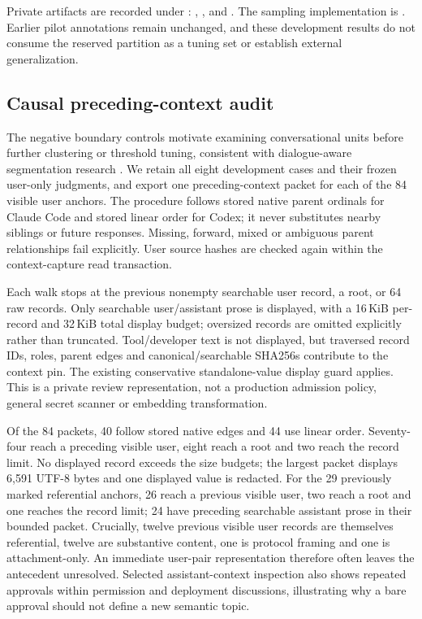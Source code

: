 \documentclass[11pt]{article}
\begin{document}
Private artifacts are recorded under :
, ,  and
. The sampling implementation is
. Earlier pilot annotations remain
unchanged, and these development results do not consume the reserved partition
as a tuning set or establish external generalization.

\subsection{Causal preceding-context audit}
The negative boundary controls motivate examining conversational units before
further clustering or threshold tuning, consistent with dialogue-aware
segmentation research \cite{khatri,xing,gao}. We retain all eight development cases
and their frozen user-only judgments, and export one preceding-context packet
for each of the 84 visible user anchors. The procedure follows stored native
parent ordinals for Claude Code and stored linear order for Codex; it never
substitutes nearby siblings or future responses. Missing, forward, mixed or
ambiguous parent relationships fail explicitly. User source hashes are checked
again within the context-capture read transaction.

Each walk stops at the previous nonempty searchable user record, a root, or
64 raw records. Only searchable user/assistant prose is displayed, with a
16\,KiB per-record and 32\,KiB total display budget; oversized records are
omitted explicitly rather than truncated. Tool/developer text is not displayed,
but traversed record IDs, roles, parent edges and canonical/searchable SHA256s
contribute to the context pin. The existing conservative standalone-value
display guard applies. This is a private review representation, not a production
admission policy, general secret scanner or embedding transformation.

Of the 84 packets, 40 follow stored native edges and 44 use linear order.
Seventy-four reach a preceding visible user, eight reach a root and two reach
the record limit. No displayed record exceeds the size budgets; the largest
packet displays 6,591 UTF-8 bytes and one displayed value is redacted.
For the 29 previously marked referential anchors, 26 reach a previous visible
user, two reach a root and one reaches the record limit; 24 have preceding
searchable assistant prose in their bounded packet. Crucially, twelve previous
visible user records are themselves referential, twelve are substantive content,
one is protocol framing and one is attachment-only. An immediate user-pair
representation therefore often leaves the antecedent unresolved. Selected
assistant-context inspection also shows repeated approvals within permission
and deployment discussions, illustrating why a bare approval should not define
a new semantic topic.
\end{document}
